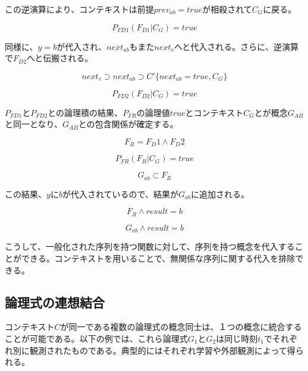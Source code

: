 \documentclass[12pt]{article}
\begin{document}
この逆演算により、コンテキストは前提\(prev_{ab}=true\)が相殺されて\(C_G\)に戻る。

\begin{equation} P_{FD1}(F_{D1}|C_G) = true \end{equation}

同様に、\(y=b\)が代入され、\(next_{ab}\)もまた\(next_v\)へと代入される。さらに、逆演算で\(F_{D2}\)へと伝搬される。

\begin{equation} next_v \supset next_{ab} \supset C'\{next_{ab}=true,C_G\} \end{equation}

\begin{equation} P_{FD2}(F_{D2}|C_G) = true \end{equation}

\(P_{FD1}\)と\(P_{FD2}\)との論理積の結果、\(P_{FR}\)の論理値\(true\)とコンテキスト\(C_G\)とが概念\(G_{AB}\)と同一となり、\(G_{AB}\)との包含関係が確定する。

\begin{equation} F_R = F_D1 \wedge F_D2\end{equation}

\begin{equation} P_{FR}(F_{R}|C_G) = true \end{equation}

\begin{equation}  G_{ab} \subset F_R\end{equation}

この結果、\(y\)に\(b\)が代入されているので、結果が\(G_{ab}\)に追加される。

\begin{equation}F_R \wedge result = b\end{equation}

\begin{equation} G_{ab} \wedge result  = b\end{equation}

こうして、一般化された序列を持つ関数に対して、序列を持つ概念を代入することができる。コンテキストを用いることで、無関係な序列に関する代入を排除できる。

\subsection{論理式の連想結合}\label{ux8ad6ux7406ux5f0fux306eux9023ux60f3ux7d50ux5408}

コンテキスト\(C\)が同一である複数の論理式の概念同士は、１つの概念に統合することが可能である。以下の例では、これら論理式\(G_1\)と\(G_2\)は同じ時刻\(t_1\)でそれぞれ別に観測されたものである。典型的にはそれぞれ学習や外部観測によって得られる。
\end{document}
